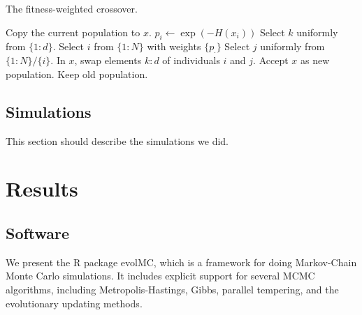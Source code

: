 \documentclass[12pt]{article}\usepackage[]{graphicx}\usepackage[]{color}
\newcommand{\U}{\mathcal U}
\newcommand{\Exp}{\mathcal E}
\begin{document}
\begin{algorithm}
  \caption{The fitness-weighted crossover.}
  \label{alg:crossover}
  \begin{algorithmic}
    \State Copy the current population to $x$.
    \State $p_i \gets \exp(-H(x_i))$
    \EndFor
    \State Select $k$ uniformly from $\{1\colon d\}.$
    \State Select $i$ from $\{1\colon N\}$ with weights $\{p_\cdot\}$
    \State Select $j$ uniformly from $\{1\colon N\} / \{i\}.$ 
    \State In $x$, swap elements $k\colon d$ of individuals $i$ and $j$.
    \If {$\Exp(1) < -H(x_i)/t_i +H(x_j)/t_j+\cdots$}
    \State Accept $x$ as new population.
    \Else 
    \State Keep old population.
    \EndIf
  \end{algorithmic}
\end{algorithm}


\subsection{Simulations}
\label{sec:methods-simulations}


This section should describe the simulations we did.

\section{Results}
\label{sec:results}

\subsection{Software}
\label{sec:software}


We present the R package evolMC, which is a framework for doing
Markov-Chain Monte Carlo simulations. It includes explicit support for
several MCMC algorithms, including Metropolis-Hastings, Gibbs,
parallel tempering, and the evolutionary updating methods.
\end{document}

